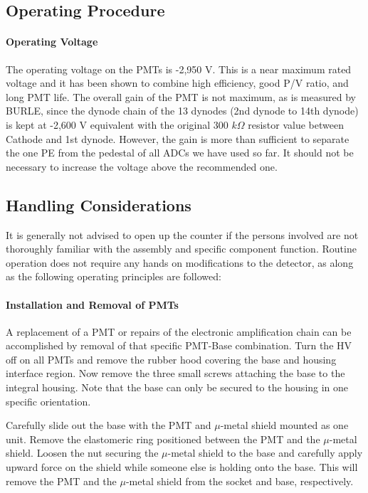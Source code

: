 \subsection{Operating Procedure}

\paragraph{Operating Voltage}

The operating voltage on the PMTs is -2,950 V. This is a near maximum rated 
voltage and it has been shown to combine high efficiency, good P/V ratio,   
and long PMT life. The overall gain of the PMT is not maximum, as is   
measured by BURLE, since the dynode chain of the 13 dynodes (2nd dynode to   
14th dynode) is kept at -2,600 V equivalent with the original 300 $k\Omega$   
resistor value between Cathode and 1st dynode. However, the gain is more   
than sufficient to separate the one PE from the pedestal of all ADCs we have   
used so far. It should not be necessary to increase the voltage above the   
recommended one. 

\subsection{Handling Considerations}

It is generally not advised to open up the counter if the persons involved are
not thoroughly familiar with the assembly and specific component function.
Routine operation does not require any hands on modifications to the detector,
as along as the following operating principles are followed: 

\paragraph{Installation and Removal of PMTs}

A replacement of a PMT or repairs of the electronic amplification chain can   
be accomplished by removal of that specific PMT-Base combination. Turn the   
HV off on all PMTs and remove the rubber hood covering the base and housing 
interface region. Now remove the three small screws attaching the base to   
the integral housing. Note that the base can only be secured to the housing   
in one specific orientation. 

Carefully slide out the base with the PMT and $\mu$-metal shield mounted as one
unit. Remove the elastomeric ring positioned between the PMT and the   
$\mu$-metal shield. Loosen the nut securing the $\mu$-metal shield to the   
base and carefully apply upward force on the shield while someone else is   
holding onto the base. This will remove the PMT and the $\mu$-metal shield   
from the socket and base, respectively. 

